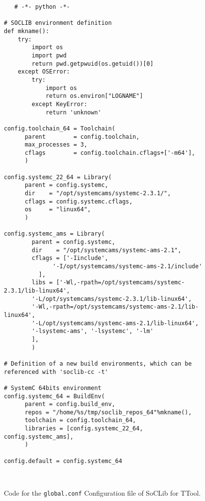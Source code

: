 \begin{figure}[H]
\begin{verbatim}
   # -*- python -*-

# SOCLIB environment definition
def mkname():
	try:
		import os
		import pwd
		return pwd.getpwuid(os.getuid())[0]
	except OSError:
		try:
			import os
			return os.environ["LOGNAME"]
		except KeyError:
			return 'unknown'

config.toolchain_64 = Toolchain(
      parent        = config.toolchain,
      max_processes = 3,
      cflags        = config.toolchain.cflags+['-m64'],
      )

config.systemc_22_64 = Library(
      parent = config.systemc,
      dir    = "/opt/systemcams/systemc-2.3.1/",
      cflags = config.systemc.cflags,
      os     = "linux64",
      )

config.systemc_ams = Library(
        parent = config.systemc,
        dir    = "/opt/systemcams/systemc-ams-2.1",
        cflags = ['-Iinclude', 
              '-I/opt/systemcams/systemc-ams-2.1/include'
          ], 
        libs = ['-Wl,-rpath=/opt/systemcams/systemc-2.3.1/lib-linux64',
        '-L/opt/systemcams/systemc-2.3.1/lib-linux64', 
        '-Wl,-rpath=/opt/systemcams/systemc-ams-2.1/lib-linux64',
        '-L/opt/systemcams/systemc-ams-2.1/lib-linux64',
        '-lsystemc-ams', '-lsystemc', '-lm' 
        ],
        )

# Definition of a new build environments, which can be referenced with 'soclib-cc -t'

# SystemC 64bits environment
config.systemc_64 = BuildEnv(
      parent = config.build_env,
      repos = "/home/%s/tmp/soclib_repos_64"%mkname(),
      toolchain = config.toolchain_64,
      libraries = [config.systemc_22_64, config.systemc_ams],
      )

config.default = config.systemc_64
   
      
\end{verbatim}
  \caption{Code for the \texttt{global.conf} Configuration file of SoCLib for TTool.}
  \label{code:global_conf_file}
\end{figure}

